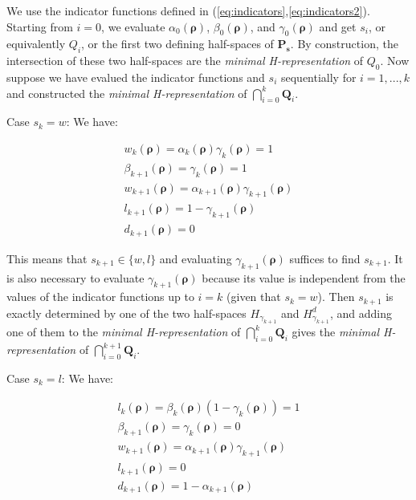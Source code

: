\documentclass[11pt]{article}
\numberwithin{equation}{section}
\numberwithin{figure}{section}
\numberwithin{table}{section}
\begin{document}
We use the indicator functions defined in (\ref{eq:indicators},\ref{eq:indicators2}). Starting from $i=0$, we evaluate $\alpha_{0}(\boldsymbol\rho)$, $\beta_{0}(\boldsymbol\rho)$, and $\gamma_{0}(\boldsymbol\rho)$ and get $s_{i}$, or equivalently $Q_{i}$, or the first two defining half-spaces of $\textbf{P}_{\boldsymbol s}$. By construction, the intersection of these two half-spaces are the \textit{minimal H-representation} of $Q_{0}$. Now suppose we have evalued the indicator functions and $s_{i}$ sequentially for $i=1,...,k$ and constructed the \textit{minimal H-representation} of $\bigcap_{i=0}^{k} \textbf{Q}_{i}$.

Case $s_{k}=w$: We have:

\begin{equation}
\begin{array}{l}
w_{k}(\boldsymbol\rho)=\alpha_{k}(\boldsymbol\rho)\gamma_{k}(\boldsymbol\rho)=1\\
\beta_{k+1}(\boldsymbol\rho)=\gamma_{k}(\boldsymbol\rho)=1\\
w_{k+1}(\boldsymbol\rho)=\alpha_{k+1}(\boldsymbol\rho)\gamma_{k+1}(\boldsymbol\rho)\\
l_{k+1}(\boldsymbol\rho)=1-\gamma_{k+1}(\boldsymbol\rho)\\
d_{k+1}(\boldsymbol\rho)=0
\end{array}
\end{equation}

\noindent This means that $s_{k+1}\in\{w,l\}$ and evaluating $\gamma_{k+1}(\boldsymbol\rho)$ suffices to find $s_{k+1}$. It is also necessary to evaluate $\gamma_{k+1}(\boldsymbol\rho)$ because its value is independent from the values of the indicator functions up to $i=k$ (given that $s_{k}=w$). Then $s_{k+1}$ is exactly determined by one of the two half-spaces $H_{\gamma_{k+1}}$ and $H^{d}_{\gamma_{k+1}}$, and adding one of them to the \textit{minimal H-representation} of $\bigcap_{i=0}^{k} \textbf{Q}_{i}$ gives the \textit{minimal H-representation} of $\bigcap_{i=0}^{k+1} \textbf{Q}_{i}$.

Case $s_{k}=l$: We have:

\begin{equation}
\begin{array}{l}
l_{k}(\boldsymbol\rho)=\beta_{k}(\boldsymbol\rho)(1-\gamma_{k}(\boldsymbol\rho))=1\\
\beta_{k+1}(\boldsymbol\rho)=\gamma_{k}(\boldsymbol\rho)=0\\
w_{k+1}(\boldsymbol\rho)=\alpha_{k+1}(\boldsymbol\rho)\gamma_{k+1}(\boldsymbol\rho)\\
l_{k+1}(\boldsymbol\rho)=0\\
d_{k+1}(\boldsymbol\rho)=1-\alpha_{k+1}(\boldsymbol\rho)
\end{array}
\end{equation}
\end{document}
